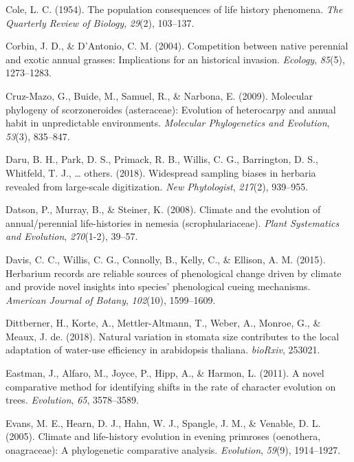 \documentclass[man,floatsintext]{apa6}
\theoremstyle{definition}
\theoremstyle{definition}
\theoremstyle{definition}
\theoremstyle{remark}
\begin{document}
\leavevmode\hypertarget{ref-cole1954population}{}%
Cole, L. C. (1954). The population consequences of life history
phenomena. \emph{The Quarterly Review of Biology}, \emph{29}(2),
103--137.

\leavevmode\hypertarget{ref-corbin2004competition}{}%
Corbin, J. D., \& D'Antonio, C. M. (2004). Competition between native
perennial and exotic annual grasses: Implications for an historical
invasion. \emph{Ecology}, \emph{85}(5), 1273--1283.

\leavevmode\hypertarget{ref-cruz2009molecular}{}%
Cruz-Mazo, G., Buide, M., Samuel, R., \& Narbona, E. (2009). Molecular
phylogeny of scorzoneroides (asteraceae): Evolution of heterocarpy and
annual habit in unpredictable environments. \emph{Molecular
Phylogenetics and Evolution}, \emph{53}(3), 835--847.

\leavevmode\hypertarget{ref-daru2018widespread}{}%
Daru, B. H., Park, D. S., Primack, R. B., Willis, C. G., Barrington, D.
S., Whitfeld, T. J., \ldots{} others. (2018). Widespread sampling biases
in herbaria revealed from large-scale digitization. \emph{New
Phytologist}, \emph{217}(2), 939--955.

\leavevmode\hypertarget{ref-datson2008climate}{}%
Datson, P., Murray, B., \& Steiner, K. (2008). Climate and the evolution
of annual/perennial life-histories in nemesia (scrophulariaceae).
\emph{Plant Systematics and Evolution}, \emph{270}(1-2), 39--57.

\leavevmode\hypertarget{ref-davis2015herbarium}{}%
Davis, C. C., Willis, C. G., Connolly, B., Kelly, C., \& Ellison, A. M.
(2015). Herbarium records are reliable sources of phenological change
driven by climate and provide novel insights into species' phenological
cueing mechanisms. \emph{American Journal of Botany}, \emph{102}(10),
1599--1609.

\leavevmode\hypertarget{ref-dittberner2018natural}{}%
Dittberner, H., Korte, A., Mettler-Altmann, T., Weber, A., Monroe, G.,
\& Meaux, J. de. (2018). Natural variation in stomata size contributes
to the local adaptation of water-use efficiency in arabidopsis thaliana.
\emph{bioRxiv}, 253021.

\leavevmode\hypertarget{ref-R-geiger_b}{}%
Eastman, J., Alfaro, M., Joyce, P., Hipp, A., \& Harmon, L. (2011). A
novel comparative method for identifying shifts in the rate of character
evolution on trees. \emph{Evolution}, \emph{65}, 3578--3589.

\leavevmode\hypertarget{ref-evans2005climate}{}%
Evans, M. E., Hearn, D. J., Hahn, W. J., Spangle, J. M., \& Venable, D.
L. (2005). Climate and life-history evolution in evening primroses
(oenothera, onagraceae): A phylogenetic comparative analysis.
\emph{Evolution}, \emph{59}(9), 1914--1927.
\end{document}
